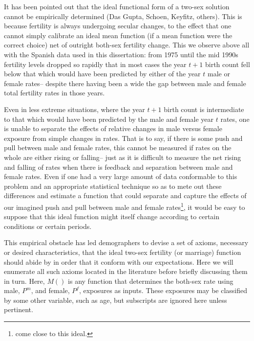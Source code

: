  \FloatBarrier
 \label{sec:axioms}
It has been pointed out that the ideal functional form of a two-sex solution
cannot be empirically determined (Das Gupta, Schoen, Keyfitz, others). This is
because fertility is always undergoing secular changes, to the effect that
one cannot simply calibrate an ideal mean function (if a mean function were the
correct choice) net of outright both-sex fertility change. This we observe above
all with the Spanish data used in this dissertation: from 1975 until the mid
1990s fertility levels dropped so rapidly that in most cases the year $t+1$
birth count fell below that which would have been predicted by either of the
year $t$ male or female rates-- despite there having been a wide the gap between
male and female total fertility rates in those years. 

Even in less
extreme situations, where the year $t+1$ birth count is intermediate to that which would
have been predicted by the male and female year $t$ rates, one is unable to
separate the effects of relative changes in male versus female exposure from
simple changes in rates. That is to say, if there is some push and pull between
male and female rates, this cannot be measured if rates on the whole are either
rising or falling-- just as it is difficult to measure the net rising and
falling of rates when there is feedback and separation between male and female
rates. Even if one had a very large amount of data conformable to this problem
and an appropriate statistical technique so as to mete out these differences 
and estimate a function that could separate and capture the effects of our
imagined push and pull between male and female
rates\footnote{\citet{alho2000competing} come close to this ideal.}, it would be easy 
to suppose that this ideal function
might itself change according to certain conditions or certain periods.

This empirical obstacle has led demographers to devise a set of axioms,
necessary or desired characteristics, that the ideal two-sex fertility
(or marriage) function should abide by in order that it conform with our
expectations. Here we will enumerate all such axioms located in the literature 
before briefly discussing them in turn. Here, $M()$ is any function that
determines the both-sex rate using male, $P^m$, and female, $P^f$, exposures as
inputs. These exposures may be classified by some other variable, such as age, but
subscripts are ignored here unless pertinent.

